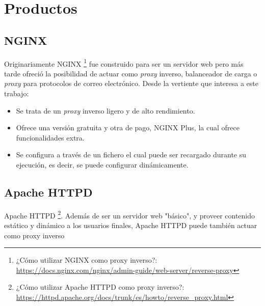 \documentclass[11pt,spanish,listoffigures]{tfgetsinf}
\begin{document}

	\section{Productos}


		\subsection{NGINX}

Originariamente NGINX \footnote{¿Cómo utilizar NGINX como proxy inverso?: \url{https://docs.nginx.com/nginx/admin-guide/web-server/reverse-proxy}} fue construido para ser un servidor web pero más tarde ofreció la posibilidad de actuar como \emph{proxy} inverso, balanceador de carga o \emph{proxy} para protocolos de correo electrónico. Desde la vertiente que interesa a este trabajo:

\begin{itemize}

	\item Se trata de un \emph{proxy} inverso ligero y de alto rendimiento.

	\item Ofrece una versión gratuita y otra de pago, NGINX Plus, la cual ofrece funcionalidades extra.

	\item Se configura a través de un fichero el cual puede ser recargado durante su ejecución, es decir, se puede configurar dinámicamente.

\end{itemize}


		\subsection{Apache HTTPD}

Apache HTTPD \footnote{¿Cómo utilizar Apache HTTPD como proxy inverso?: \url{https://httpd.apache.org/docs/trunk/es/howto/reverse_proxy.html}}. Además de ser un servidor web "básico", y proveer contenido estático y dinámico a los usuarios finales, Apache HTTPD puede también actuar como proxy inverso

\end{document}
